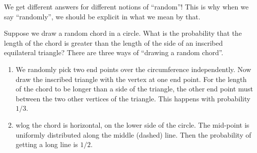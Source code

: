 \begin{note}
\begin{field}
\begin{eg}
\begin{enumerate}
           \begin{center}
          \end{center}
      \end{enumerate}
      We get different answers for different notions of ``random''! This is why when we say ``randomly'', we should be explicit in what we mean by that.
    \end{eg}
  \end{field}
  \begin{field}
    \begin{eg}
      Suppose we draw a random chord in a circle. What is the probability that the length of the chord is greater than the length of the side of an inscribed equilateral triangle?
      There are three ways of ``drawing a random chord''.
      \begin{enumerate}
        \item We randomly pick two end points over the circumference independently. Now draw the inscribed triangle with the vertex at one end point. For the length of the chord to be longer than a side of the triangle, the other end point must between the two other vertices of the triangle. This happens with probability $1/3$.
          \begin{center}
          \end{center}
        \item wlog the chord is horizontal, on the lower side of the circle. The mid-point is uniformly distributed along the middle (dashed) line. Then the probability of getting a long line is $1/2$.

\end{enumerate}
\end{eg}
\end{field}
\end{note}
